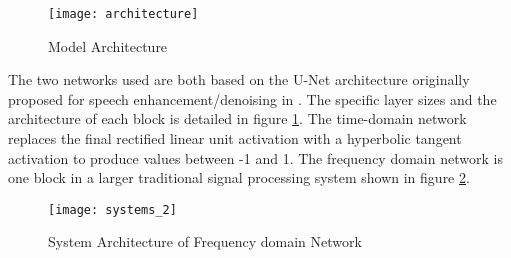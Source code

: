 \begin{figure}[h]
\begin{center}
	\texttt{[image: architecture]}
	\caption{Model Architecture}
	\label{fig:architecture}
\end{center}
\end{figure}

\noindent The two networks used are both based on the U-Net architecture originally proposed for speech enhancement/denoising in \cite{pandey_new_2019}. The specific layer sizes and the architecture of each block is detailed in figure \ref{fig:architecture}. The time-domain network replaces the final rectified linear unit activation with a hyperbolic tangent activation to produce values between -1 and 1. The frequency domain network is one block in a larger traditional signal processing system shown in figure \ref{fig:systems}.

\begin{figure}[h]
	\centering
	\texttt{[image: systems\_2]}
	\caption{System Architecture of Frequency domain Network}
	\label{fig:systems}
\end{figure}

